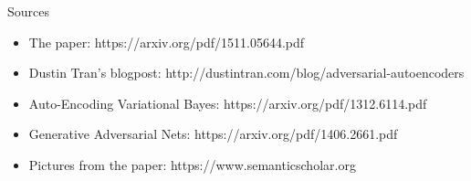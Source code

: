 \documentclass{beamer}
\begin{document}
\begin{frame}{Sources}
  \begin{itemize}
    \item The paper: https://arxiv.org/pdf/1511.05644.pdf
    \item Dustin Tran's blogpost: http://dustintran.com/blog/adversarial-autoencoders
    \item Auto-Encoding Variational Bayes: https://arxiv.org/pdf/1312.6114.pdf
    \item Generative Adversarial Nets: https://arxiv.org/pdf/1406.2661.pdf
    \item Pictures from the paper: https://www.semanticscholar.org
  \end{itemize}
\end{frame}


%
%
%
%
%


%
%
%
%

%
%

%
%
%
\end{document}
